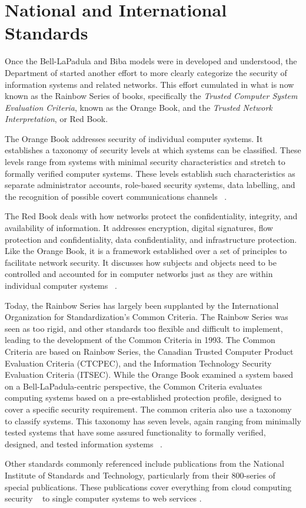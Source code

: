 \section{National and International Standards}
Once the Bell-LaPadula and Biba models were in developed and understood, the Department of  started another effort to more clearly categorize the security of information systems and related networks.  This effort cumulated in what is now known as the Rainbow Series of books, specifically the {\it Trusted Computer System Evaluation Criteria}, known as the Orange Book, and the {\it Trusted Network Interpretation}, or Red Book.

The Orange Book addresses security of individual computer systems.  It establishes a taxonomy of security levels at which systems can be classified.  These levels range from systems with minimal security characteristics and stretch to formally verified computer systems.  These levels establish such characteristics as separate administrator accounts, role-based security systems, data labelling, and the recognition of possible covert communications channels ~\cite{OrangeBook}.

The Red Book deals with how networks protect the confidentiality, integrity, and availability of information.  It addresses encryption, digital signatures, flow protection and confidentiality, data confidentiality, and infrastructure protection.  Like the Orange Book, it is a framework established over a set of principles to facilitate network security.  It discusses how subjects and objects need to be controlled and accounted for in computer networks just as they are within individual computer systems ~\cite{RedBook}.

Today, the Rainbow Series has largely been supplanted by the International Organization for Standardization's Common Criteria.  The Rainbow Series was seen as too rigid, and other standards too flexible and difficult to implement, leading to the development of the Common Criteria in 1993.  The Common Criteria are based on Rainbow Series, the Canadian Trusted Computer Product Evaluation Criteria (CTCPEC), and the Information Technology Security Evaluation Criteria (ITSEC).  While the Orange Book examined a system based on a Bell-LaPadula-centric perspective, the Common Criteria evaluates computing systems based on a pre-established protection profile, designed to cover a specific security requirement.  The common criteria also use a taxonomy to classify systems.  This taxonomy has seven levels, again ranging from minimally tested systems that have some assured functionality to formally verified, designed, and tested information systems ~\cite{CommonCriteria}.

Other standards commonly referenced include publications from the National Institute of Standards and Technology, particularly from their 800-series of special publications.  These publications cover everything from cloud computing security ~\cite{NIST800:144} to single computer systems \cite{NIST800:12} to web services \cite{NIST800:95}.